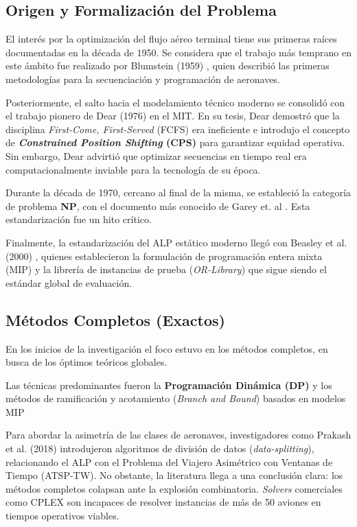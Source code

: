 \documentclass[letter, 10pt]{article}
\begin{document}
\subsection{Origen y Formalizaci\'on del Problema}
El inter\'es por la optimizaci\'on del flujo a\'ereo terminal tiene sus primeras ra\'ices documentadas en la d\'ecada de 1950. Se considera que el trabajo m\'as temprano en este \'ambito fue realizado por Blumstein (1959) \cite{blumstein1959}, quien describi\'o las primeras metodolog\'ias para la secuenciaci\'on y programaci\'on de aeronaves. 

Posteriormente, el salto hacia el modelamiento t\'ecnico moderno se consolid\'o con el trabajo pionero de Dear (1976) \cite{dear1976} en el MIT. En su tesis, Dear demostr\'o que la disciplina \textit{First-Come, First-Served} (FCFS) era ineficiente e introdujo el concepto de \textbf{\textit{Constrained Position Shifting} (CPS)} para garantizar equidad operativa. Sin embargo, Dear advirti\'o que optimizar secuencias en tiempo real era computacionalmente inviable para la tecnolog\'ia de su \'epoca.

Durante la d\'ecada de 1970, cercano al final de la misma, se estableci\'o la categoría de problema \textbf{NP}, con el documento m\'as conocido de Garey et. al \cite{garey1979}. Esta estandarizaci\'on fue un hito cr\'itico.

Finalmente, la estandarizaci\'on del ALP est\'atico moderno lleg\'o con Beasley et al. (2000) \cite{beasley2000}, quienes establecieron la formulaci\'on de programaci\'on entera mixta (MIP) y la librer\'ia de instancias de prueba (\textit{OR-Library}) que sigue siendo el est\'andar global de evaluaci\'on.


\subsection{M\'etodos Completos (Exactos)}
En los inicios de la investigaci\'on el foco estuvo en los m\'etodos completos, en busca de los \'optimos te\'oricos globales.

Las t\'ecnicas predominantes fueron la \textbf{Programaci\'on Din\'amica (DP)} y los m\'etodos de ramificaci\'on y acotamiento (\textit{Branch and Bound}) basados en modelos MIP \cite{beasley2000}

Para abordar la asimetr\'ia de las clases de aeronaves, investigadores como Prakash et al. (2018) \cite{prakash2018} introdujeron algoritmos de divisi\'on de datos (\textit{data-splitting}), relacionando el ALP con el Problema del Viajero Asim\'etrico con Ventanas de Tiempo (ATSP-TW). No obstante, la literatura llega a una conclusi\'on clara: los m\'etodos completos colapsan ante la explosi\'on combinatoria. \textit{Solvers} comerciales como CPLEX son incapaces de resolver instancias de m\'as de 50 aviones en tiempos operativos viables.
\end{document}
